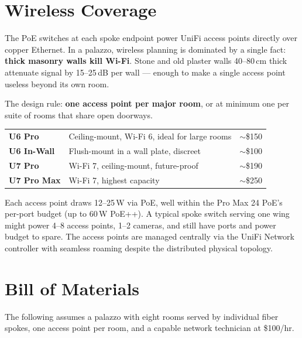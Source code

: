 \documentclass[]{anvil-proposal}
\begin{document}
\section{Wireless Coverage}

The PoE switches at each spoke endpoint power UniFi access points directly over copper Ethernet. In a palazzo, wireless planning is dominated by a single fact: \textbf{thick masonry walls kill Wi-Fi}. Stone and old plaster walls 40--80\,cm thick attenuate signal by 15--25\,dB per wall --- enough to make a single access point useless beyond its own room.

The design rule: \textbf{one access point per major room}, or at minimum one per suite of rooms that share open doorways.

\begin{metricbox}
\begin{tabularx}{\textwidth}{@{} >{\bfseries}l X r @{}}
U6 Pro & Ceiling-mount, Wi-Fi 6, ideal for large rooms & $\sim$\$150 \\
U6 In-Wall & Flush-mount in a wall plate, discreet & $\sim$\$100 \\
U7 Pro & Wi-Fi 7, ceiling-mount, future-proof & $\sim$\$190 \\
U7 Pro Max & Wi-Fi 7, highest capacity & $\sim$\$250 \\
\end{tabularx}
\end{metricbox}

Each access point draws 12--25\,W via PoE, well within the Pro Max 24 PoE's per-port budget (up to 60\,W PoE++). A typical spoke switch serving one wing might power 4--8 access points, 1--2 cameras, and still have ports and power budget to spare. The access points are managed centrally via the UniFi Network controller with seamless roaming despite the distributed physical topology.

\section{Bill of Materials}

The following assumes a palazzo with eight rooms served by individual fiber spokes, one access point per room, and a capable network technician at \$100/hr.
\end{document}
